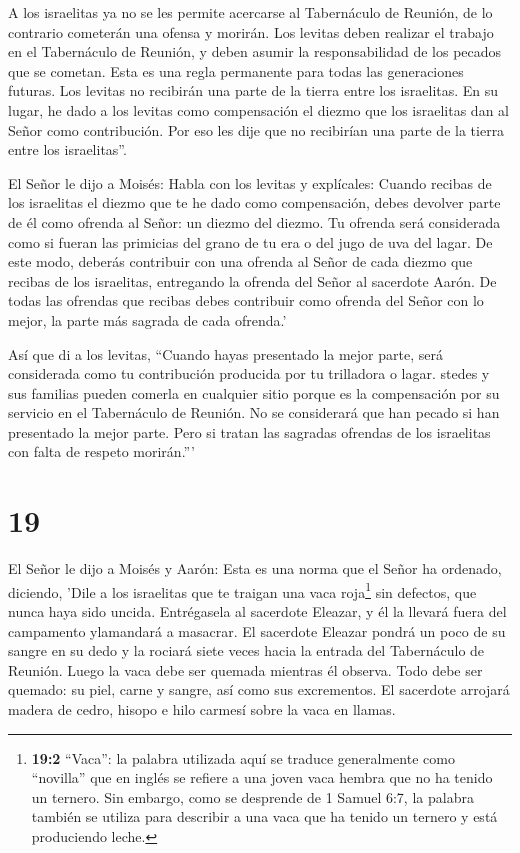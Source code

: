 A los israelitas ya no se les permite acercarse al
Tabernáculo de Reunión, de lo contrario cometerán una ofensa y morirán.
 Los levitas deben realizar el trabajo en el Tabernáculo de
Reunión, y deben asumir la responsabilidad de los pecados que se
cometan. Esta es una regla permanente para todas las generaciones
futuras. Los levitas no recibirán una parte de la tierra entre los
israelitas.  En su lugar, he dado a los levitas como
compensación el diezmo que los israelitas dan al Señor como
contribución. Por eso les dije que no recibirían una parte de la tierra
entre los israelitas''.

 El Señor le dijo a Moisés:  Habla con los
levitas y explícales: Cuando recibas de los israelitas el diezmo que te
he dado como compensación, debes devolver parte de él como ofrenda al
Señor: un diezmo del diezmo.  Tu ofrenda será considerada
como si fueran las primicias del grano de tu era o del jugo de uva del
lagar.  De este modo, deberás contribuir con una ofrenda al
Señor de cada diezmo que recibas de los israelitas, entregando la
ofrenda del Señor al sacerdote Aarón.  De todas las
ofrendas que recibas debes contribuir como ofrenda del Señor con lo
mejor, la parte más sagrada de cada ofrenda.'

 Así que di a los levitas, ``Cuando hayas presentado la
mejor parte, será considerada como tu contribución producida por tu
trilladora o lagar.  stedes y sus familias pueden comerla
en cualquier sitio porque es la compensación por su servicio en el
Tabernáculo de Reunión.  No se considerará que han pecado
si han presentado la mejor parte. Pero si tratan las sagradas ofrendas
de los israelitas con falta de respeto morirán.'''

\hypertarget{section-18}{%
\section{19}\label{section-18}}

 El Señor le dijo a Moisés y Aarón:  Esta es una
norma que el Señor ha ordenado, diciendo, 'Dile a los israelitas que te
traigan una vaca roja\footnote{\textbf{19:2} ``Vaca'': la palabra
  utilizada aquí se traduce generalmente como ``novilla'' que en inglés
  se refiere a una joven vaca hembra que no ha tenido un ternero. Sin
  embargo, como se desprende de 1 Samuel 6:7, la palabra también se
  utiliza para describir a una vaca que ha tenido un ternero y está
  produciendo leche.} sin defectos, que nunca haya sido uncida.
 Entrégasela al sacerdote Eleazar, y él la llevará fuera del
campamento ylamandará a masacrar.  El sacerdote Eleazar
pondrá un poco de su sangre en su dedo y la rociará siete veces hacia la
entrada del Tabernáculo de Reunión.  Luego la vaca debe ser
quemada mientras él observa. Todo debe ser quemado: su piel, carne y
sangre, así como sus excrementos.  El sacerdote arrojará
madera de cedro, hisopo e hilo carmesí sobre la vaca en llamas.

